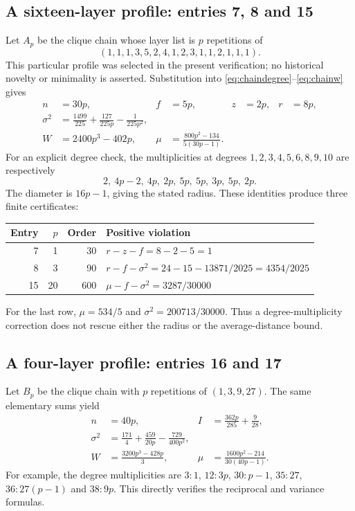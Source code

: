 \documentclass[11pt,a4paper]{article}
\theoremstyle{remark}\newtheorem{remark}[theorem]{Remark}
\begin{document}
\subsection{A sixteen-layer profile: entries 7, 8 and 15}
Let $A_p$ be the clique chain whose layer list is $p$ repetitions of
\begin{equation}\label{eq:profilea}
 (1,1,1,3,5,2,4,1,2,3,1,1,2,1,1,1).
\end{equation}
This particular profile was selected in the present verification; no
historical novelty or minimality is asserted. Substitution into
\eqref{eq:chaindegree}--\eqref{eq:chainw} gives
\begin{align}
 n&=30p,& f&=5p,&z&=2p,&r&=8p,\label{eq:profileavalues}\\
 \sigma^2&=\frac{1499}{225}+\frac{127}{225p}-\frac1{225p^2},\label{eq:profileavar}\\
 W&=2400p^3-402p,&
 \mu&=\frac{800p^2-134}{5(30p-1)}.\label{eq:profileamean}
\end{align}
For an explicit degree check, the multiplicities at degrees
$1,2,3,4,5,6,8,9,10$ are respectively
\[
 2,\ 4p-2,\ 4p,\ 2p,\ 5p,\ 5p,\ 3p,\ 5p,\ 2p.
\]
The diameter is $16p-1$, giving the stated radius. These identities produce
three finite certificates:
\begin{center}\small
\begin{tabular}{@{}r r r l@{}}\toprule
Entry & $p$ & Order & Positive violation\\\midrule
7 &1&30& $r-z-f=8-2-5=1$\\
8 &3&90& $r-f-\sigma^2=24-15-13871/2025=4354/2025$\\
15&20&600& $\mu-f-\sigma^2=3287/30000$\\\bottomrule
\end{tabular}
\end{center}
For the last row, $\mu=534/5$ and $\sigma^2=200713/30000$.
Thus a degree-multiplicity correction does not rescue either the radius
or the average-distance bound.

\subsection{A four-layer profile: entries 16 and 17}
Let $B_p$ be the clique chain with $p$ repetitions of $(1,3,9,27)$.
The same elementary sums yield
\begin{align}
 n&=40p,&
 I&=\frac{362p}{285}+\frac9{28},\label{eq:profilebi}\\
 \sigma^2&=\frac{171}{4}+\frac{459}{20p}-\frac{729}{400p^2},\label{eq:profilebvar}\\
 W&=\frac{3200p^3-428p}{3},&
 \mu&=\frac{1600p^2-214}{30(40p-1)}.\label{eq:profilebmean}
\end{align}
For example, the degree multiplicities are
$3:1$, $12:3p$, $30:p-1$, $35:27$, $36:27(p-1)$ and $38:9p$.
This directly verifies the reciprocal and variance formulas.
\end{document}
